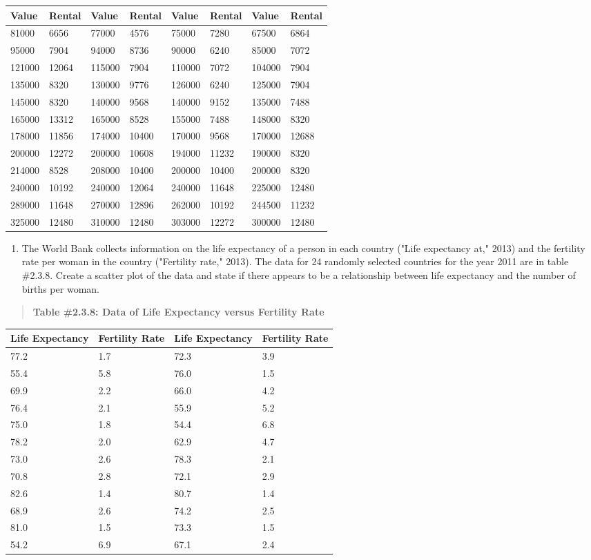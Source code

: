 \documentclass[]{book}
\providecommand{\tightlist}{%
  \setlength{\itemsep}{0pt}\setlength{\parskip}{0pt}}
\begin{document}
\begin{longtable}[]{@{}llllllll@{}}
\toprule
Value & Rental & Value & Rental & Value & Rental & Value & Rental\tabularnewline
\midrule
\endhead
81000 & 6656 & 77000 & 4576 & 75000 & 7280 & 67500 & 6864\tabularnewline
95000 & 7904 & 94000 & 8736 & 90000 & 6240 & 85000 & 7072\tabularnewline
121000 & 12064 & 115000 & 7904 & 110000 & 7072 & 104000 & 7904\tabularnewline
135000 & 8320 & 130000 & 9776 & 126000 & 6240 & 125000 & 7904\tabularnewline
145000 & 8320 & 140000 & 9568 & 140000 & 9152 & 135000 & 7488\tabularnewline
165000 & 13312 & 165000 & 8528 & 155000 & 7488 & 148000 & 8320\tabularnewline
178000 & 11856 & 174000 & 10400 & 170000 & 9568 & 170000 & 12688\tabularnewline
200000 & 12272 & 200000 & 10608 & 194000 & 11232 & 190000 & 8320\tabularnewline
214000 & 8528 & 208000 & 10400 & 200000 & 10400 & 200000 & 8320\tabularnewline
240000 & 10192 & 240000 & 12064 & 240000 & 11648 & 225000 & 12480\tabularnewline
289000 & 11648 & 270000 & 12896 & 262000 & 10192 & 244500 & 11232\tabularnewline
325000 & 12480 & 310000 & 12480 & 303000 & 12272 & 300000 & 12480\tabularnewline
\bottomrule
\end{longtable}

\begin{enumerate}
\def\labelenumi{\arabic{enumi}.}
\setcounter{enumi}{4}
\tightlist
\item
  The World Bank collects information on the life expectancy of a
  person in each country ("Life expectancy at," 2013) and the
  fertility rate per woman in the country ("Fertility rate," 2013).
  The data for 24 randomly selected countries for the year 2011 are in
  table \#2.3.8. Create a scatter plot of the data and state if there
  appears to be a relationship between life expectancy and the number
  of births per woman.
\end{enumerate}

\begin{quote}
\textbf{Table \#2.3.8: Data of Life Expectancy versus Fertility Rate}
\end{quote}

\begin{longtable}[]{@{}llll@{}}
\toprule
Life Expectancy & Fertility Rate & Life Expectancy & Fertility Rate\tabularnewline
\midrule
\endhead
77.2 & 1.7 & 72.3 & 3.9\tabularnewline
55.4 & 5.8 & 76.0 & 1.5\tabularnewline
69.9 & 2.2 & 66.0 & 4.2\tabularnewline
76.4 & 2.1 & 55.9 & 5.2\tabularnewline
75.0 & 1.8 & 54.4 & 6.8\tabularnewline
78.2 & 2.0 & 62.9 & 4.7\tabularnewline
73.0 & 2.6 & 78.3 & 2.1\tabularnewline
70.8 & 2.8 & 72.1 & 2.9\tabularnewline
82.6 & 1.4 & 80.7 & 1.4\tabularnewline
68.9 & 2.6 & 74.2 & 2.5\tabularnewline
81.0 & 1.5 & 73.3 & 1.5\tabularnewline
54.2 & 6.9 & 67.1 & 2.4\tabularnewline
\bottomrule
\end{longtable}
\end{document}

